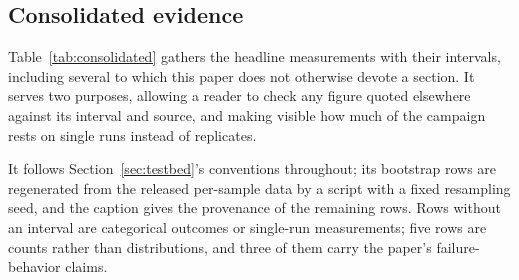\documentclass[preprint,12pt]{elsarticle}
\begin{document}
\subsection{Consolidated evidence}
\label{sec:exp_consolidated}

Table~\ref{tab:consolidated} gathers the headline measurements with their
intervals, including several to which this paper does not otherwise devote a
section. It serves two purposes, allowing a reader to check any figure quoted
elsewhere against its interval and source, and making visible how much of the
campaign rests on single runs instead of replicates.

It follows Section~\ref{sec:testbed}'s conventions throughout; its bootstrap
rows are regenerated from the released per-sample data by a script with a fixed
resampling seed, and the caption gives the provenance of the remaining rows.
Rows without an interval are categorical outcomes or single-run measurements;
five rows are counts rather than distributions, and three of them carry
the paper's failure-behavior claims.
\end{document}
